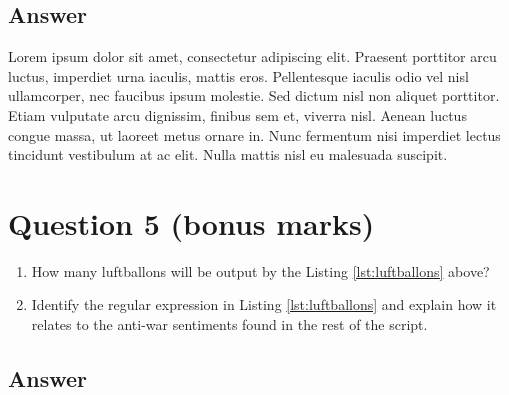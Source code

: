 \documentclass[
	12pt, %
]{../Template/fphw}
\begin{document}
\begin{problem}

\end{problem}


\subsection*{Answer}

Lorem ipsum dolor sit amet, consectetur adipiscing elit. Praesent porttitor arcu luctus, imperdiet urna iaculis, mattis eros. Pellentesque iaculis odio vel nisl ullamcorper, nec faucibus ipsum molestie. Sed dictum nisl non aliquet porttitor. Etiam vulputate arcu dignissim, finibus sem et, viverra nisl. Aenean luctus congue massa, ut laoreet metus ornare in. Nunc fermentum nisi imperdiet lectus tincidunt vestibulum at ac elit. Nulla mattis nisl eu malesuada suscipit.


\section*{Question 5 (bonus marks)}

\begin{problem}
	
	
	\begin{enumerate}
		\item How many luftballons will be output by the Listing \ref{lst:luftballons} above?
		\item Identify the regular expression in Listing \ref{lst:luftballons} and explain how it relates to the anti-war sentiments found in the rest of the script.
	\end{enumerate}

\end{problem}


\subsection*{Answer}
\end{document}
